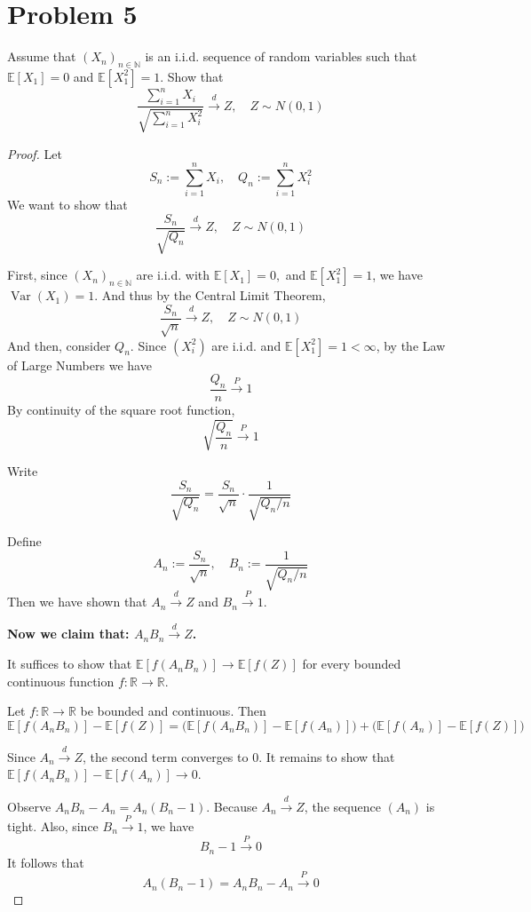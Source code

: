 \section*{Problem 5}
Assume that $\left(X_n\right)_{n \in \mathbb{N}}$ is an i.i.d. 
sequence of random variables such that $\mathbb{E}\left[X_1\right]=0$ 
and $\mathbb{E}\left[X_1^2\right]=1$. Show that
$$
\frac{\sum_{i=1}^n X_i}{\sqrt{\sum_{i=1}^n X_i^2}} 
\xrightarrow{d} Z, \quad Z \sim N(0,1) 
$$
\begin{proof}
Let
\[
S_n:=\sum_{i=1}^n X_i,
\quad
Q_n:=\sum_{i=1}^n X_i^2
\]
We want to show that
\[
\frac{S_n}{\sqrt{Q_n}} \xrightarrow{d} Z,
\quad Z\sim N(0,1)
\]

First, since $(X_n)_{n\in\mathbb{N}}$ are i.i.d. with
\(
\mathbb{E}[X_1]=0,
\) and \(
\mathbb{E}[X_1^2]=1\), 
we have $\operatorname{Var}(X_1)=1$. 
And thus by the Central Limit Theorem,
\[
\frac{S_n}{\sqrt{n}} \xrightarrow{d} Z,
\quad Z\sim N(0,1)
\]
And then, consider $Q_n$. 
Since $(X_i^2)$ are i.i.d. and $\mathbb{E}[X_1^2]=1<\infty$, 
by the Law of Large Numbers we have
\[
\frac{Q_n}{n} \xrightarrow{P} 1
\]
By continuity of the square root function,
\[
\sqrt{\frac{Q_n}{n}} \xrightarrow{P} 1
\]

Write
\[
\frac{S_n}{\sqrt{Q_n}}
=
\frac{S_n}{\sqrt{n}} \cdot \frac{1}{\sqrt{Q_n/n}}
\]

Define
\[
A_n:=\frac{S_n}{\sqrt{n}},
\quad
B_n:=\frac{1}{\sqrt{Q_n/n}}
\]
Then we have shown that
 $A_n \xrightarrow{d} Z$ and $B_n \xrightarrow{P} 1$. 


\textbf{Now we claim that: 
$A_n B_n \xrightarrow{d} Z$.}

It suffices to show that $\mathbb{E}[f(A_n B_n)] \to \mathbb{E}[f(Z)]$ 
for every bounded continuous function $f:\mathbb{R}\to\mathbb{R}$.

Let $f:\mathbb{R}\to\mathbb{R}$ be bounded and continuous.
Then 
\[
\mathbb E[f(A_nB_n)]-\mathbb E[f(Z)]
=
\bigl(\mathbb E[f(A_nB_n)]-\mathbb E[f(A_n)]\bigr)
+
\bigl(\mathbb E[f(A_n)]-\mathbb E[f(Z)]\bigr)
\]

Since $A_n\xrightarrow{d}Z$, the second term converges to $0$. 
It remains to show that
\(
\mathbb E[f(A_nB_n)]-\mathbb E[f(A_n)]\to 0
\).

Observe
\(
A_nB_n-A_n=A_n(B_n-1)
\). 
Because $A_n\xrightarrow{d}Z$, the sequence $(A_n)$ is tight. 
Also, since $B_n\xrightarrow{P}1$, we have
\[
B_n-1\xrightarrow{P}0
\]
It follows that
\[
A_n(B_n-1) = A_nB_n-A_n\xrightarrow{P}0
\]


\end{proof}
